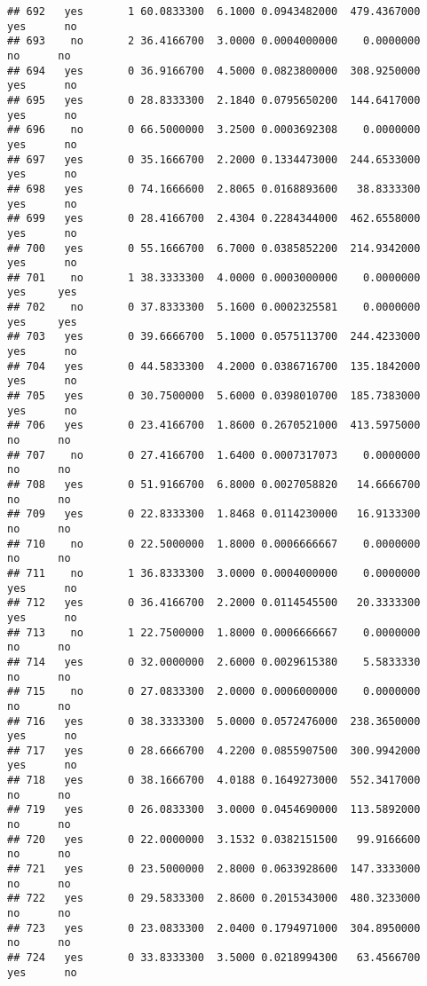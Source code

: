 \documentclass[]{article}
\begin{document}
\begin{verbatim}
## 692   yes       1 60.0833300  6.1000 0.0943482000  479.4367000   yes      no
## 693    no       2 36.4166700  3.0000 0.0004000000    0.0000000    no      no
## 694   yes       0 36.9166700  4.5000 0.0823800000  308.9250000   yes      no
## 695   yes       0 28.8333300  2.1840 0.0795650200  144.6417000   yes      no
## 696    no       0 66.5000000  3.2500 0.0003692308    0.0000000   yes      no
## 697   yes       0 35.1666700  2.2000 0.1334473000  244.6533000   yes      no
## 698   yes       0 74.1666600  2.8065 0.0168893600   38.8333300   yes      no
## 699   yes       0 28.4166700  2.4304 0.2284344000  462.6558000   yes      no
## 700   yes       0 55.1666700  6.7000 0.0385852200  214.9342000   yes      no
## 701    no       1 38.3333300  4.0000 0.0003000000    0.0000000   yes     yes
## 702    no       0 37.8333300  5.1600 0.0002325581    0.0000000   yes     yes
## 703   yes       0 39.6666700  5.1000 0.0575113700  244.4233000   yes      no
## 704   yes       0 44.5833300  4.2000 0.0386716700  135.1842000   yes      no
## 705   yes       0 30.7500000  5.6000 0.0398010700  185.7383000   yes      no
## 706   yes       0 23.4166700  1.8600 0.2670521000  413.5975000    no      no
## 707    no       0 27.4166700  1.6400 0.0007317073    0.0000000    no      no
## 708   yes       0 51.9166700  6.8000 0.0027058820   14.6666700    no      no
## 709   yes       0 22.8333300  1.8468 0.0114230000   16.9133300    no      no
## 710    no       0 22.5000000  1.8000 0.0006666667    0.0000000    no      no
## 711    no       1 36.8333300  3.0000 0.0004000000    0.0000000   yes      no
## 712   yes       0 36.4166700  2.2000 0.0114545500   20.3333300   yes      no
## 713    no       1 22.7500000  1.8000 0.0006666667    0.0000000    no      no
## 714   yes       0 32.0000000  2.6000 0.0029615380    5.5833330    no      no
## 715    no       0 27.0833300  2.0000 0.0006000000    0.0000000    no      no
## 716   yes       0 38.3333300  5.0000 0.0572476000  238.3650000   yes      no
## 717   yes       0 28.6666700  4.2200 0.0855907500  300.9942000   yes      no
## 718   yes       0 38.1666700  4.0188 0.1649273000  552.3417000    no      no
## 719   yes       0 26.0833300  3.0000 0.0454690000  113.5892000    no      no
## 720   yes       0 22.0000000  3.1532 0.0382151500   99.9166600    no      no
## 721   yes       0 23.5000000  2.8000 0.0633928600  147.3333000    no      no
## 722   yes       0 29.5833300  2.8600 0.2015343000  480.3233000    no      no
## 723   yes       0 23.0833300  2.0400 0.1794971000  304.8950000    no      no
## 724   yes       0 33.8333300  3.5000 0.0218994300   63.4566700   yes      no

\end{verbatim}
\end{document}
